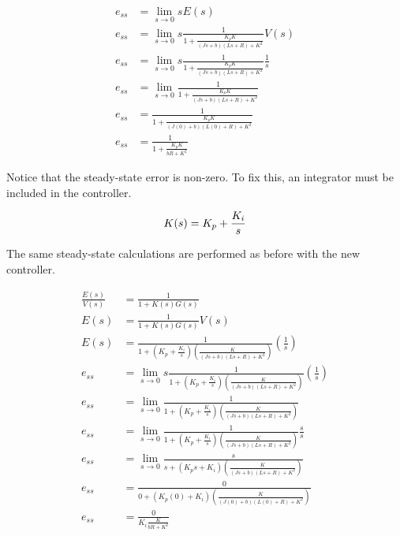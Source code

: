 \documentclass[10pt,conference,compsoc]{IEEEtran}
\begin{document}
\begin{align}
  e_{ss} &= \lim_{s\to0} sE(s) \nonumber \\
  e_{ss} &= \lim_{s\to0} s \frac{1}{1 + \frac{K_p K}{(Js+b)(Ls+R)+K^2}} V(s)
    \nonumber \\
  e_{ss} &= \lim_{s\to0} s \frac{1}{1 + \frac{K_p K}{(Js+b)(Ls+R)+K^2}}
    \frac{1}{s} \nonumber \\
  e_{ss} &= \lim_{s\to0} \frac{1}{1 + \frac{K_p K}{(Js+b)(Ls+R)+K^2}}
    \nonumber \\
  e_{ss} &= \frac{1}{1 + \frac{K_p K}{(J(0)+b)(L(0)+R)+K^2}} \nonumber \\
  e_{ss} &= \frac{1}{1 + \frac{K_p K}{bR+K^2}} \label{eq:ss_nonzero}
\end{align}

\noindent Notice that the \gls{steady-state error} is non-zero. To fix this, an
integrator must be included in the controller.

\begin{equation*}
  K(s) = K_p + \frac{K_i}{s} \\
\end{equation*}

\noindent The same steady-state calculations are performed as before with the
new controller.

\begin{align*}
  \frac{E(s)}{V(s)} &= \frac{1}{1 + K(s)G(s)} \\
  E(s) &= \frac{1}{1 + K(s)G(s)} V(s) \\
  E(s) &= \frac{1}{1 + \left(K_p + \frac{K_i}{s}\right)
    \left(\frac{K}{(Js+b)(Ls+R)+K^2}\right)} \left(\frac{1}{s}\right) \\
  e_{ss} &= \lim_{s\to0} s \frac{1}{1 + \left(K_p + \frac{K_i}{s}\right)
    \left(\frac{K}{(Js+b)(Ls+R)+K^2}\right)} \left(\frac{1}{s}\right) \\
  e_{ss} &= \lim_{s\to0} \frac{1}{1 + \left(K_p + \frac{K_i}{s}\right)
    \left(\frac{K}{(Js+b)(Ls+R)+K^2}\right)} \\
  e_{ss} &= \lim_{s\to0} \frac{1}{1 + \left(K_p + \frac{K_i}{s}\right)
    \left(\frac{K}{(Js+b)(Ls+R)+K^2}\right)} \frac{s}{s} \\
  e_{ss} &= \lim_{s\to0} \frac{s}{s + \left(K_p s + K_i\right)
    \left(\frac{K}{(Js+b)(Ls+R)+K^2}\right)} \\
  e_{ss} &= \frac{0}{0 + (K_p (0) + K_i)
    \left(\frac{K}{(J(0)+b)(L(0)+R)+K^2}\right)} \\
  e_{ss} &= \frac{0}{K_i \frac{K}{bR+K^2}} \\
\end{align*}
\end{document}
